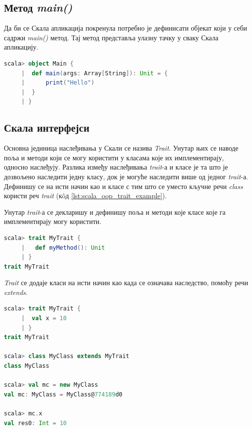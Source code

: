 \documentclass[12pt,oneside]{memoir}
\begin{document}
\subsection{Метод \textit{main()}}
\label{subsec:scala_oop_main_app}

Да би се Скала апликација покренула потребно је дефинисати објекат који у себи садржи \textit{main()} метод. Тај метод представља улазну тачку у сваку Скала апликацију. \cite{scala_prog}

\begin{lstlisting}[language=Scala, caption={Пример main метода}, label={lst:scala_oop_main_method}]
scala> object Main {
     |  def main(args: Array[String]): Unit = {
     |      print("Hello")
     | 	}
     | }
\end{lstlisting}

\subsection{Скала интерфејси}
\label{subsec:scala_traits}

Основна јединица наслеђивања у Скали се назива \textit{Trait}. Унутар њих се наводе поља и методи који се могу користити у класама које их имплементирају, односно наслеђују. Разлика између наслеђивања \textit{trait}-а и класе је та што је дозвољено наследити једну класу, док је могуће наследити више од једног \textit{trait}-а. Дефинишу се на исти начин као и класе с тим што се уместо кључне речи \textit{class} користи реч \textit{trait} (к\^{o}д \ref{lst:scala_oop_trait_example}). \cite{scala_prog}

Унутар \textit{trait}-а се декларишу и дефинишу поља и методи које класе које га имплементирају могу користити.

\begin{lstlisting}[language=Scala, caption={Скала \textit{trait}}, label={lst:scala_oop_trait_example}]
scala> trait MyTrait {
     |   def myMethod(): Unit
     | }
trait MyTrait
\end{lstlisting}

\textit{Trait} се додаје класи на исти начин као када се означава наследство, помоћу речи \textit{extends}. 

\begin{lstlisting}[language=Scala, caption={Додавање \textit{trait}-а класи}, label={lst:scala_oop_traits_extends_example}]
scala> trait MyTrait {
     |  val x = 10
     | }
trait MyTrait

scala> class MyClass extends MyTrait
class MyClass

scala> val mc = new MyClass
val mc: MyClass = MyClass@774189d0

scala> mc.x
val res0: Int = 10
\end{lstlisting}
\end{document}
